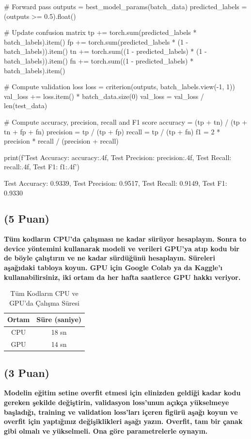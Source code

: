 \documentclass[11pt]{article}
\begin{document}
\begin{python}
            # Forward pass
            outputs = best_model_params(batch_data)
            predicted_labels = (outputs >= 0.5).float()

            # Update confusion matrix
            tp += torch.sum(predicted_labels * batch_labels).item()
            fp += torch.sum(predicted_labels * (1 - batch_labels)).item()
            tn += torch.sum((1 - predicted_labels) * (1 - batch_labels)).item()
            fn += torch.sum((1 - predicted_labels) * batch_labels).item()

            # Compute validation loss
            loss = criterion(outputs, batch_labels.view(-1, 1))
            val_loss += loss.item() * batch_data.size(0)
        val_loss = val_loss / len(test_data)

    # Compute accuracy, precision, recall and F1 score
    accuracy = (tp + tn) / (tp + tn + fp + fn)
    precision = tp / (tp + fp)
    recall = tp / (tp + fn)
    f1 = 2 * precision * recall / (precision + recall)

    print(f'Test Accuracy: {accuracy:.4f}, Test Precision: {precision:.4f}, Test Recall: {recall:.4f}, Test F1: {f1:.4f}')
\end{python}

Test Accuracy: 0.9339, Test Precision: 0.9517, Test Recall: 0.9149, Test F1: 0.9330


\subsection{(5 Puan)} \textbf{Tüm kodların CPU'da çalışması ne kadar sürüyor hesaplayın. Sonra to device yöntemini kullanarak modeli ve verileri GPU'ya atıp kodu bir de böyle çalıştırın ve ne kadar sürdüğünü hesaplayın. Süreleri aşağıdaki tabloya koyun. GPU için Google Colab ya da Kaggle'ı kullanabilirsiniz, iki ortam da her hafta saatlerce GPU hakkı veriyor.}

\begin{table}[ht!]
    \centering
    \caption{Tüm Kodların CPU ve GPU'da Çalışma Süresi}
    \begin{tabular}{c|c}
        Ortam & Süre (saniye) \\\hline
        CPU & 18 sn \\
        GPU & 14 sn\\
    \end{tabular}
    \label{tab:my_table}
\end{table}

\subsection{(3 Puan)} \textbf{Modelin eğitim setine overfit etmesi için elinizden geldiği kadar kodu gereken şekilde değiştirin, validasyon loss'unun açıkça yükselmeye başladığı, training ve validation loss'ları içeren figürü aşağı koyun ve overfit için yaptığınız değişiklikleri aşağı yazın. Overfit, tam bir çanak gibi olmalı ve yükselmeli. Ona göre parametrelerle oynayın.}
\end{document}
